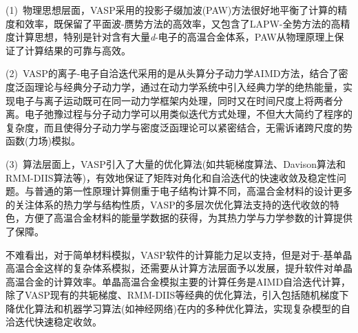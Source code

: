 (1)~物理思想层面，\textrm{VASP}采用的投影子缀加波\textrm{(PAW)}方法很好地平衡了计算的精度和效率，既保留了平面波-赝势方法的高效率，又包含了\textrm{LAPW}-全势方法的高精度计算思想，特别是针对含有大量\textit{d}-电子的高温合金体系，\textrm{PAW}从物理原理上保证了计算结果的可靠与高效。

(2)~\textrm{VASP}的离子-电子自洽迭代采用的是从头算分子动力学\textrm{AIMD}方法，结合了密度泛函理论与经典分子动力学，通过在动力学系统中引入经典力学的绝热能量，实现电子与离子运动既可在同一动力学框架内处理，同时又在时间尺度上将两者分离。电子弛豫过程与分子动力学可以用类似迭代方式处理，不但大大简约了程序的复杂度，而且使得分子动力学与密度泛函理论可以紧密结合，无需诉诸跨尺度的势函数(力场)模拟。

(3)~算法层面上，\textrm{VASP}引入了大量的优化算法(如共轭梯度算法、\textrm{Davison}算法和\textrm{RMM-DIIS}算法等)，有效地保证了矩阵对角化和自洽迭代的快速收敛及稳定性问题。与普通的第一性原理计算侧重于电子结构计算不同，高温合金材料的设计更多的关注体系的热力学与结构性质，\textrm{VASP}的多层次优化算法支持的迭代收敛的特色，方便了高温合金材料的能量学数据的获得，为其热力学与力学参数的计算提供了保障。

不难看出，对于简单材料模拟，\textrm{VASP}软件的计算能力足以支持，但是对于-基单晶高温合金这样的复杂体系模拟，还需要从计算方法层面予以发展，提升软件对单晶高温合金的计算效率。单晶高温合金模拟主要的计算任务是\textrm{AIMD}自洽迭代计算，除了\textrm{VASP}现有的共轭梯度、\textrm{RMM-DIIS}等经典的优化算法，引入包括随机梯度下降优化算法和机器学习算法(如神经网络)在内的多种优化算法，实现复杂模型的自洽迭代快速稳定收敛。


